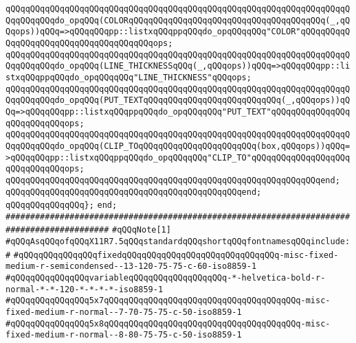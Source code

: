 \verb|qQQqqQQqqQQqqQQqqQQqqQQqqQQqqQQqqQQqqQQqqQQqqQQqqQQqqQQqqQQqqQQqqQQqqQQqqQQqqQQqdo_opqQQq(COLORqQQqqQQqqQQqqQQqqQQqqQQqqQQqqQQqqQQqqQQq(_,qQQqops))qQQq=>qQQqqQQqpp::listxqQQqppqQQqdo_opqQQqqQQq"COLOR"qQQqqQQqqQQqqQQqqQQqqQQqqQQqqQQqqQQqqQQqops;|\newline
\verb|qQQqqQQqqQQqqQQqqQQqqQQqqQQqqQQqqQQqqQQqqQQqqQQqqQQqqQQqqQQqqQQqqQQqqQQqqQQqqQQqdo_opqQQq(LINE_THICKNESSqQQq(_,qQQqops))qQQq=>qQQqqQQqpp::listxqQQqppqQQqdo_opqQQqqQQq"LINE_THICKNESS"qQQqops;|\newline
\verb|qQQqqQQqqQQqqQQqqQQqqQQqqQQqqQQqqQQqqQQqqQQqqQQqqQQqqQQqqQQqqQQqqQQqqQQqqQQqqQQqdo_opqQQq(PUT_TEXTqQQqqQQqqQQqqQQqqQQqqQQqqQQq(_,qQQqops))qQQq=>qQQqqQQqpp::listxqQQqppqQQqdo_opqQQqqQQq"PUT_TEXT"qQQqqQQqqQQqqQQqqQQqqQQqqQQqops;|\newline
\verb|qQQqqQQqqQQqqQQqqQQqqQQqqQQqqQQqqQQqqQQqqQQqqQQqqQQqqQQqqQQqqQQqqQQqqQQqqQQqqQQqdo_opqQQq(CLIP_TOqQQqqQQqqQQqqQQqqQQqqQQq(box,qQQqops))qQQq=>qQQqqQQqpp::listxqQQqppqQQqdo_opqQQqqQQq"CLIP_TO"qQQqqQQqqQQqqQQqqQQqqQQqqQQqqQQqops;|\newline
\verb|qQQqqQQqqQQqqQQqqQQqqQQqqQQqqQQqqQQqqQQqqQQqqQQqqQQqqQQqqQQqqQQqend;|\newline
\verb|qQQqqQQqqQQqqQQqqQQqqQQqqQQqqQQqqQQqqQQqqQQqqQQqend;|\newline
\newline
\verb|qQQqqQQqqQQqqQQq};|\newline
\verb|end;|\newline
\newline
\newline
\verb|###########################################################################################|\newline
\verb|#qQQqNote[1]|\newline
\verb|#qQQqAsqQQqofqQQqX11R7.5qQQqstandardqQQqshortqQQqfontnamesqQQqinclude:|\newline
\verb|#|\newline
\verb|#qQQqqQQqqQQqqQQqfixedqQQqqQQqqQQqqQQqqQQqqQQqqQQqqQQq-misc-fixed-medium-r-semicondensed--13-120-75-75-c-60-iso8859-1|\newline
\verb|#qQQqqQQqqQQqqQQqvariableqQQqqQQqqQQqqQQqqQQq-*-helvetica-bold-r-normal-*-*-120-*-*-*-*-iso8859-1|\newline
\verb|#qQQqqQQqqQQqqQQq5x7qQQqqQQqqQQqqQQqqQQqqQQqqQQqqQQqqQQqqQQq-misc-fixed-medium-r-normal--7-70-75-75-c-50-iso8859-1|\newline
\verb|#qQQqqQQqqQQqqQQq5x8qQQqqQQqqQQqqQQqqQQqqQQqqQQqqQQqqQQqqQQq-misc-fixed-medium-r-normal--8-80-75-75-c-50-iso8859-1|\newline
